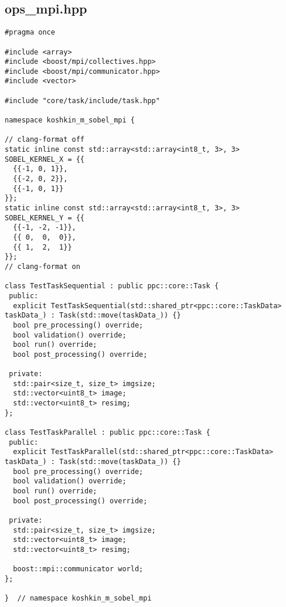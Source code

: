 \documentclass[12pt]{article}
\begin{document}
\subsection{ops\_mpi.hpp}
\begin{lstlisting}
#pragma once

#include <array>
#include <boost/mpi/collectives.hpp>
#include <boost/mpi/communicator.hpp>
#include <vector>

#include "core/task/include/task.hpp"

namespace koshkin_m_sobel_mpi {

// clang-format off
static inline const std::array<std::array<int8_t, 3>, 3> SOBEL_KERNEL_X = {{
  {{-1, 0, 1}},
  {{-2, 0, 2}},
  {{-1, 0, 1}}
}};
static inline const std::array<std::array<int8_t, 3>, 3> SOBEL_KERNEL_Y = {{
  {{-1, -2, -1}},
  {{ 0,  0,  0}},
  {{ 1,  2,  1}}
}};
// clang-format on

class TestTaskSequential : public ppc::core::Task {
 public:
  explicit TestTaskSequential(std::shared_ptr<ppc::core::TaskData> taskData_) : Task(std::move(taskData_)) {}
  bool pre_processing() override;
  bool validation() override;
  bool run() override;
  bool post_processing() override;

 private:
  std::pair<size_t, size_t> imgsize;
  std::vector<uint8_t> image;
  std::vector<uint8_t> resimg;
};

class TestTaskParallel : public ppc::core::Task {
 public:
  explicit TestTaskParallel(std::shared_ptr<ppc::core::TaskData> taskData_) : Task(std::move(taskData_)) {}
  bool pre_processing() override;
  bool validation() override;
  bool run() override;
  bool post_processing() override;

 private:
  std::pair<size_t, size_t> imgsize;
  std::vector<uint8_t> image;
  std::vector<uint8_t> resimg;

  boost::mpi::communicator world;
};

}  // namespace koshkin_m_sobel_mpi
\end{lstlisting}
\end{document}
